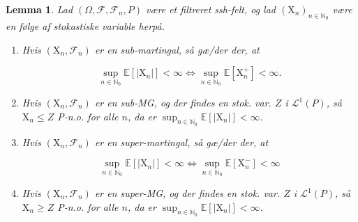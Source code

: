 \documentclass{article}
\newcommand{\1}{\mathbbm{1}}
\theoremstyle{boxed}
\newtheorem{lemma}[theorem]{Lemma}
\begin{document}
\begin{theorem-box}
    \begin{lemma}
       Lad $\left(\Omega, \mathcal{F}, \mathcal{F}_n, P\right)$ være et filtreret ssh-felt, og lad $\left(\mathrm{X}_n\right)_{n \in \mathbb{N}_0}$ være en følge af stokastiske variable herpå.
\begin{enumerate}
    \item[\textnormal{(i)}] Hvis $\left(\mathrm{X}_n, \mathcal{F}_n\right)$ er en sub-martingal, så gæ/der der, at

    $$
    \sup _{n \in \mathbb{N}_0} \mathbb{E}\left[\left|\mathrm{X}_n\right|\right]<\infty \Longleftrightarrow \sup _{n \in \mathbb{N}_0} \mathbb{E}\left[\mathrm{X}_n^{+}\right]<\infty .
    $$
    \item[\textnormal{(ii)}] Hvis $\left(\mathrm{X}_n, \mathcal{F}_n\right)$ er en sub-MG, og der findes en stok. var. $Z$ i $\mathcal{L}^1(P)$, så $\mathrm{X}_n \leq Z$ P-n.o. for alle $n$, da er $\sup _{n \in \mathbb{N}_0} \mathbb{E}\left[\left|\mathrm{X}_n\right|\right]<\infty$.

    \item[\textnormal{(iii)}] Hvis $\left(\mathrm{X}_n, \mathcal{F}_n\right)$ er en super-martingal, så gæ/der der, at

    $$
    \sup _{n \in \mathbb{N}_0} \mathbb{E}\left[\left|\mathrm{X}_n\right|\right]<\infty \Longleftrightarrow \sup _{n \in \mathbb{N}_0} \mathbb{E}\left[\mathrm{X}_n^{-}\right]<\infty
    $$
    \item[\textnormal{(iv)}] Hvis $\left(\mathrm{X}_n, \mathcal{F}_n\right)$ er en super-MG, og der findes en stok. var. $Z$ i $\mathcal{L}^1(P)$, så $\mathrm{X}_n \geq Z$ P-n.o. for alle $n$, da er $\sup _{n \in \mathbb{N}_0} \mathbb{E}\left[\left|\mathrm{X}_n\right|\right]<\infty$.
\end{enumerate}
    \end{lemma}
\end{theorem-box}
\end{document}
